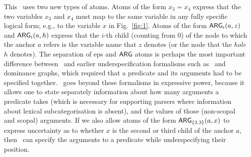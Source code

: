This \rmrs\ uses two new types of atoms.  Atoms of the form $x_3=x_4$
express that the two variables $x_3$ and $x_4$ must map to the same
variable in any fully specific logical form; e.g., to the variable $x$
in Fig.~\ref{fig:1}.  Atoms of the form
$\mathsf{ARG}_i(a,z)$ and $\mathsf{ARG}_i(a,h)$ express that the $i$-th child
(counting from 0) of the
node to which the anchor $a$ refers is the variable name that $z$ denotes
(or the node that the {\em hole} $h$ denotes).  The separation of
{\sc ep}s and $\mathsf{ARG}$ atoms is perhaps the most important difference between
\rmrs\ and earlier underspecification formalisms such as \mrs\ and
dominance graphs, which required that a predicate and its arguments
had to be specified together.  \rmrs\ goes beyond these formalisms in
expressive power, because it allows one to state separately
information about how many arguments a predicate takes (which is
necessary for supporting parsers where information about lexical
subcategorisation is absent), and the values of
those (non-scopal and scopal) arguments.   If we also allow atoms of the form
$\mathsf{ARG}_{\{2,3\}}(a,x)$ to express uncertainty as to whether $x$ is the
second or third child of the anchor $a$, then \rmrs\ can specify the
arguments to a predicate while underspecifying their position. 

